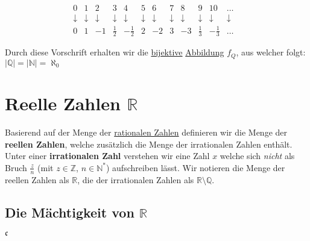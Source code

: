 \documentclass[../../main.tex]{subfiles}
\begin{document}
\begin{itemize}
			$$			
			\begin{matrix}
			0 & 1 & 2           & 3 & 4           & 5 & 6 & 7 & 8 & 9 & 10 & \dots \\
			\downarrow & \downarrow & \downarrow & \downarrow & \downarrow & \downarrow & \downarrow & \downarrow & \downarrow & \downarrow & \downarrow & \downarrow & \\
			0 & 1 & -1 & \frac{1}{2} & -\frac{1}{2} & 2 & -2 & 3 & -3 & \frac{1}{3} & - \frac{1}{3} & \dots
			\end{matrix}
			$$
			
			Durch diese Vorschrift erhalten wir die \hyperref[def:Bijektiv]{bijektive} \hyperref[def:Abbildung]{Abbildung} $f_Q$, aus welcher folgt: $|\mathbb{Q}| = |\mathbb{N}| = \aleph_0$
		
		\end{itemize}
		
		\section{Reelle Zahlen $\mathbb{R}$}		
		
		\begin{definition}
			\label{def:ReelleZahlen}
			\label{def:irrationaleZahl}
			Basierend auf der Menge der \hyperref[def:RationaleZahlen]{rationalen Zahlen} definieren wir die Menge der \textbf{reellen Zahlen}, welche zusätzlich die Menge der irrationalen Zahlen enthält. Unter einer \textbf{irrationalen Zahl} verstehen wir eine Zahl $x$ welche sich \textit{nicht} als Bruch $\frac{z}{n}$ (mit $z \in \mathbb{Z}$, $n \in \mathbb{N}^*$) aufschreiben lässt. Wir notieren die Menge der reellen Zahlen als $\mathbb{R}$, die der irrationalen Zahlen als $\mathbb{R} \setminus \mathbb{Q}$.
		\end{definition}
	
		\subsection*{Die Mächtigkeit von $\mathbb{R}$}
	
		\begin{definition}
			\label{def:überabzählbarUnendlich}
			$\mathfrak{c}$
		\end{definition}
		
\end{document}
